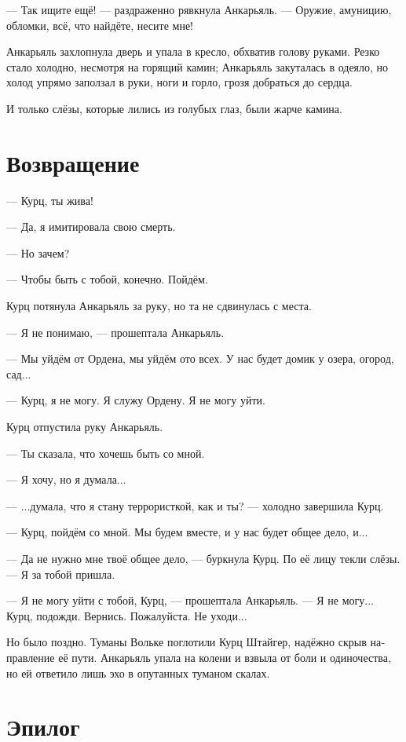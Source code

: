 \documentclass[a4paper,12pt,fleqn]{book}\usepackage{polyglossia}\setdefaultlanguage[babelshorthands=true]{russian}\setotherlanguage{english}\defaultfontfeatures{Ligatures=TeX,Mapping=tex-text}\usepackage{xcolor}\newcommand{\ml}[3]{#2}
\begin{document}
--- Так ищите ещё! --- раздраженно рявкнула Анкарьяль.
--- Оружие, амуницию, обломки, всё, что найдёте, несите мне!

Анкарьяль захлопнула дверь и упала в кресло, обхватив голову руками.
Резко стало холодно, несмотря на горящий камин;
Анкарьяль закуталась в одеяло, но холод упрямо заползал в руки, ноги и горло, грозя добраться до сердца.

И только слёзы, которые лились из голубых глаз, были жарче камина. 

\section{Возвращение}

--- Курц, ты жива!

--- Да, я имитировала свою смерть.

--- Но зачем?

--- Чтобы быть с тобой, конечно.
Пойдём.

Курц потянула Анкарьяль за руку, но та не сдвинулась с места.

--- Я не понимаю, --- прошептала Анкарьяль.

--- Мы уйдём от Ордена, мы уйдём ото всех.
У нас будет домик у озера, огород, сад...

--- Курц, я не могу.
Я служу Ордену.
Я не могу уйти.

Курц отпустила руку Анкарьяль.

--- Ты сказала, что хочешь быть со мной.

--- Я хочу, но я думала...

--- ...думала, что я стану террористкой, как и ты? --- холодно завершила Курц.

--- Курц, пойдём со мной.
Мы будем вместе, и у нас будет общее дело, и...

--- Да не нужно мне твоё общее дело, --- буркнула Курц.
По её лицу текли слёзы.
--- Я за тобой пришла.

--- Я не могу уйти с тобой, Курц, --- прошептала Анкарьяль.
--- Я не могу...
Курц, подожди.
Вернись.
Пожалуйста.
Не уходи...

Но было поздно.
Туманы Вольке поглотили Курц Штайгер, надёжно скрыв направление её пути.
Анкарьяль упала на колени и взвыла от боли и одиночества, но ей ответило лишь эхо в опутанных туманом скалах.

\section{Эпилог}
\end{document}
